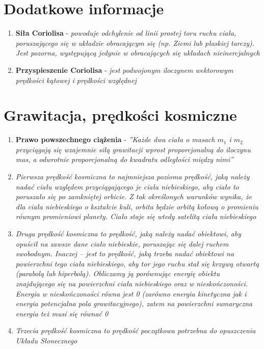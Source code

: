 \documentclass[12pt,twoside,a4paper]{book}
\begin{document}
\section{Dodatkowe informacje}
\begin{enumerate}[label=(\alph*)]
\item\textbf{Siła Coriolisa} - \textit{powoduje odchylenie od linii prostej toru ruchu ciała, poruszającego się w układzie obracającym się (np. Ziemi lub płaskiej tarczy). Jest pozorna, występującą jedynie w obracających się układach nieinercjalnych}
\item\textbf{Przyspieszenie Coriolisa} - \textit{jest podwojonym iloczynem wektorowym prędkości kątowej i prędkości względnej}
\end{enumerate}
\section{Grawitacja, prędkości kosmiczne}
\begin{enumerate}[label=(\alph*)]
\item\textbf{Prawo powszechnego ciążenia} - \textit{''Każde dwa ciała o masach $m_1$ i $m_2$ przyciągają się wzajemnie siłą grawitacji wprost proporcjonalną do iloczynu mas, a odwrotnie proporcjonalną do kwadratu odległości między nimi''}
\item\textit{Pierwsza prędkość kosmiczna to najmniejsza pozioma prędkość, jaką należy nadać ciału względem przyciągającego je ciała niebieskiego, aby ciało to poruszało się po zamkniętej orbicie. Z tak określonych warunków wynika, że dla ciała niebieskiego o kształcie kuli, orbita będzie orbitą kołową o promieniu równym promieniowi planety. Ciało staje się wtedy satelitą ciała niebieskiego}
\item\textit{Druga prędkość kosmiczna to prędkość, jaką należy nadać obiektowi, aby opuścił na zawsze dane ciało niebieskie, poruszając się dalej ruchem swobodnym. Inaczej – jest to prędkość, jaką trzeba nadać obiektowi na powierzchni tego ciała niebieskiego, aby tor jego ruchu stał się krzywą otwartą (parabolą lub hiperbolą). Obliczamy ją porównując energię obiektu znajdującego się na powierzchni ciała niebieskiego oraz w nieskończoności. Energia w nieskończoności równa jest 0 (zarówno energia kinetyczna jak i energia potencjalna pola grawitacyjnego), zatem na powierzchni sumaryczna energia też musi się równać 0}
\item\textit{Trzecia prędkość kosmiczna to prędkość początkowa potrzebna do opuszczenia Układu Słonecznego}
\end{enumerate}
\end{document}
